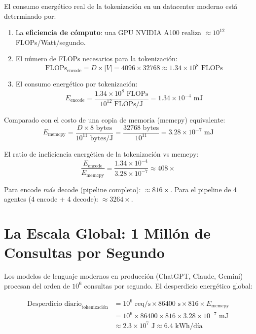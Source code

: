 El consumo energético real de la tokenización en un datacenter moderno está
determinado por:

\begin{enumerate}
\item La \textbf{eficiencia de cómputo}: una GPU NVIDIA A100 realiza
$\approx 10^{12}$ FLOPs/Watt/segundo.

\item El número de FLOPs necesarios para la tokenización:
\begin{equation}
\text{FLOPs}_{\text{encode}} = D \times |V| = 4096 \times 32768 \approx 1.34 \times 10^8 \text{ FLOPs}
\end{equation}

\item El consumo energético por tokenización:
\begin{equation}
E_{\text{encode}} = \frac{1.34 \times 10^8 \text{ FLOPs}}{10^{12} \text{ FLOPs/J}} = 1.34 \times 10^{-4} \text{ mJ}
\end{equation}
\end{enumerate}

Comparado con el costo de una copia de memoria (memcpy) equivalente:
\begin{equation}
E_{\text{memcpy}} = \frac{D \times 8 \text{ bytes}}{10^{11} \text{ bytes/J}} = \frac{32768 \text{ bytes}}{10^{11}} = 3.28 \times 10^{-7} \text{ mJ}
\end{equation}

El ratio de ineficiencia energética de la tokenización vs memcpy:
\begin{equation}
\frac{E_{\text{encode}}}{E_{\text{memcpy}}} = \frac{1.34 \times 10^{-4}}{3.28 \times 10^{-7}} \approx 408\times
\end{equation}

Para encode \textit{más} decode (pipeline completo): $\approx 816\times$.
Para el pipeline de 4 agentes (4 encode + 4 decode): $\approx 3264\times$.

\section{La Escala Global: 1 Millón de Consultas por Segundo}

Los modelos de lenguaje modernos en producción (ChatGPT, Claude, Gemini) procesan
del orden de $10^6$ consultas por segundo. El desperdicio energético global:

\begin{align}
\text{Desperdicio diario}_{\text{tokenización}} &= 10^6 \text{ req/s} \times 86400 \text{ s} \times 816 \times E_{\text{memcpy}} \\
&= 10^6 \times 86400 \times 816 \times 3.28 \times 10^{-7} \text{ mJ} \\
&\approx 2.3 \times 10^7 \text{ J} \approx 6.4 \text{ kWh/día}
\end{align}


